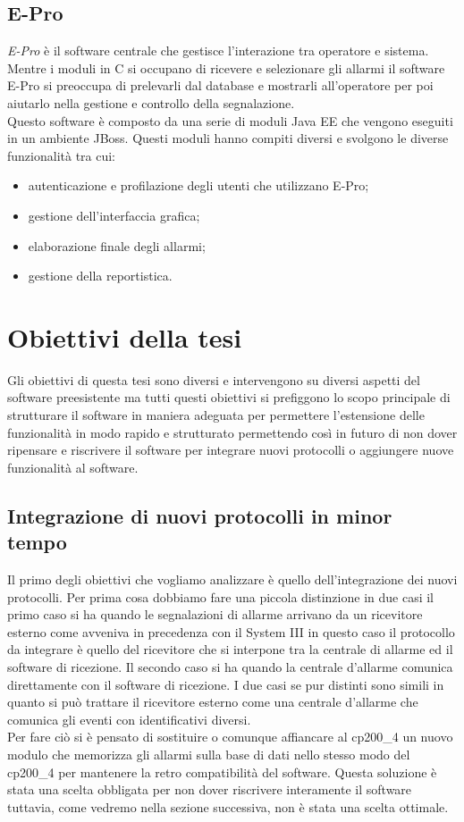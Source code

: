 \subsection{E-Pro}
\emph{E-Pro} è il software centrale che gestisce l'interazione tra operatore e sistema. Mentre i moduli in C si occupano di ricevere e selezionare gli allarmi il software E-Pro si preoccupa di prelevarli dal database e mostrarli all'operatore per poi aiutarlo nella gestione e controllo della segnalazione.\\
Questo software è composto da una serie di moduli Java EE che vengono eseguiti in un ambiente JBoss. Questi moduli hanno compiti diversi e svolgono le diverse funzionalità tra cui:
\begin{itemize}
	\item autenticazione e profilazione degli utenti che utilizzano E-Pro;
	\item gestione dell'interfaccia grafica;
	\item elaborazione finale degli allarmi;
	\item gestione della reportistica.
\end{itemize}
\section{Obiettivi della tesi}
Gli obiettivi di questa tesi sono diversi e intervengono su diversi aspetti del software preesistente ma tutti questi obiettivi si prefiggono lo scopo principale di strutturare il software in maniera adeguata per permettere l'estensione delle funzionalità in modo rapido e strutturato permettendo così in futuro di non dover ripensare e riscrivere il software per integrare nuovi protocolli o aggiungere nuove funzionalità al software.
\subsection{Integrazione di nuovi protocolli in minor tempo}
Il primo degli obiettivi che vogliamo analizzare è quello dell'integrazione dei nuovi protocolli. Per prima cosa dobbiamo fare una piccola distinzione in due casi il primo caso si ha quando le segnalazioni di allarme arrivano da un ricevitore esterno come avveniva in precedenza con il System III  in questo caso il protocollo da integrare è quello del ricevitore che si interpone tra la centrale di allarme ed il software di ricezione. Il secondo caso si ha quando la centrale d'allarme comunica direttamente con il software di ricezione.  I due casi se pur distinti sono simili in quanto si può trattare il ricevitore esterno come una centrale d'allarme che comunica gli eventi con identificativi diversi.\\
Per fare ciò si è pensato di sostituire o comunque affiancare al cp200\_4 un nuovo modulo che memorizza gli allarmi sulla base di dati nello stesso modo del cp200\_4 per mantenere la retro compatibilità del software. Questa soluzione è stata una scelta obbligata per non dover riscrivere interamente il software tuttavia, come vedremo nella sezione successiva, non è stata una scelta ottimale.
